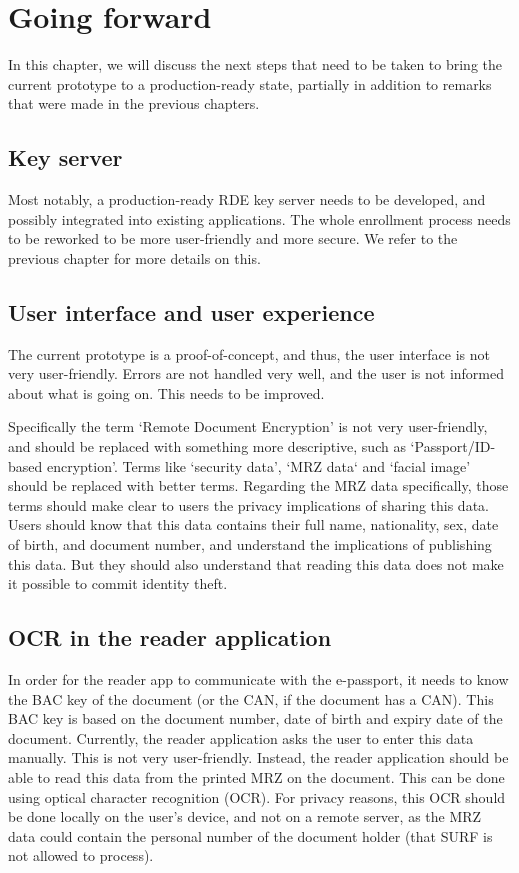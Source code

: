 \chapter{Going forward}
\label{ch:going-forward}
In this chapter, we will discuss the next steps that need to be taken to bring the current prototype to a production-ready state, partially in addition to remarks that were made in the previous chapters.

\section{Key server}
\label{sec:key-server}
Most notably, a production-ready RDE key server needs to be developed, and possibly integrated into existing applications.
The whole enrollment process needs to be reworked to be more user-friendly and more secure.
We refer to the previous chapter for more details on this.

\section{User interface and user experience}
\label{sec:user-interface-and-user-experience}
The current prototype is a proof-of-concept, and thus, the user interface is not very user-friendly.
Errors are not handled very well, and the user is not informed about what is going on.
This needs to be improved.

Specifically the term `Remote Document Encryption' is not very user-friendly, and should be replaced with something more descriptive, such as `Passport/ID-based encryption'.
Terms like `security data', `MRZ data` and `facial image' should be replaced with better terms.
Regarding the MRZ data specifically, those terms should make clear to users the privacy implications of sharing this data.
Users should know that this data contains their full name, nationality, sex, date of birth, and document number, and understand the implications of publishing this data.
But they should also understand that reading this data does not make it possible to commit identity theft.

\section{OCR in the reader application}
\label{sec:ocr-in-the-reader-application}
In order for the reader app to communicate with the e-passport, it needs to know the BAC key of the document (or the CAN, if the document has a CAN).
This BAC key is based on the document number, date of birth and expiry date of the document.
Currently, the reader application asks the user to enter this data manually.
This is not very user-friendly.
Instead, the reader application should be able to read this data from the printed MRZ on the document.
This can be done using optical character recognition (OCR).
For privacy reasons, this OCR should be done locally on the user's device, and not on a remote server, as the MRZ data could contain the personal number of the document holder (that SURF is not allowed to process).

